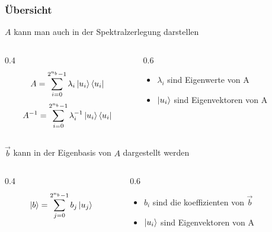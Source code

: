     \begin{frame}
    \frametitle{Übersicht}

        \hfil

        $A$ kann man auch in der Spektralzerlegung darstellen

        \hfil
        \begin{columns}[c]
            \begin{column}{0.4\hsize}\centering
            $$A = \sum_{i=0}^{2^{n_b}-1} \lambda_i \ket{u_i}\bra{u_i}$$
            $$A^{-1} = \sum_{i=0}^{2^{n_b}-1} \lambda_i^{-1} \ket{u_i}\bra{u_i}$$
            \end{column}

            \begin{column}{0.6\hsize}
            \begin{itemize}
            \item   $\lambda_i$ sind Eigenwerte von A
            \item   $\ket{u_i}$ sind Eigenvektoren von A
            \end{itemize}
 
            \end{column}
        \end{columns}

        \hfil

        \hfil

        $\vec{b}$ kann in der Eigenbasis von $A$ dargestellt werden 

        \hfil

        \begin{columns}[c]
            \begin{column}{0.4\hsize}\centering
            $$\ket{b} = \sum_{j=0}^{2^{n_b}-1} b_j\ket{u_j}$$
            \end{column}
            \begin{column}{0.6\hsize}
            \begin{itemize}
            \item   $b_i$ sind die koeffizienten von $\vec{b}$
            \item   $\ket{u_i}$ sind Eigenvektoren von A
            \end{itemize}
 
            \end{column}
        \end{columns}



   \end{frame}

